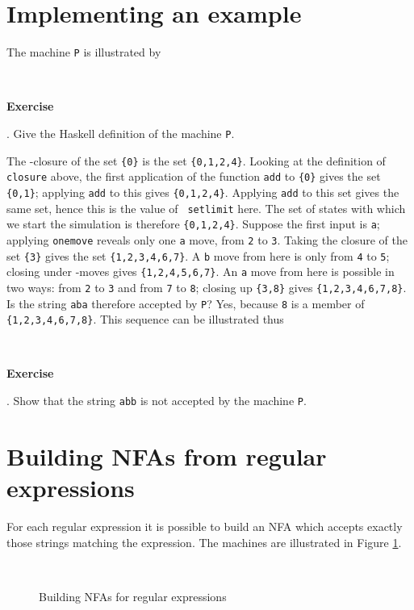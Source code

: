 \documentclass[11pt]{article}
\begin{document}
\section{Implementing an example}

The machine {\tt P} is illustrated by
\noindent
\begin{center}\  \end{center}

\medskip
\noindent
{\bf Exercise}

\medskip
{}. Give the Haskell definition of the machine {\tt P}.

\medskip
\noindent
The \eps-closure of the set {\tt \{0\}} is the set {\tt \{0,1,2,4\}}. 
Looking at the definition of {\tt closure} above, the
first application of the function {\tt add} to {\tt \{0\}} gives the set
{\tt \{0,1\}}; applying {\tt add} to this gives {\tt \{0,1,2,4\}}. Applying
{\tt add} to this set gives the same set, hence this is the value of {\tt
setlimit} here. The set of states with which we start the simulation
is therefore {\tt \{0,1,2,4\}}. Suppose the first input is {\tt a}; applying
{\tt onemove} reveals only one {\tt a} move, from {\tt 2} to {\tt 3}. Taking
the closure of the set {\tt \{3\}} gives the set {\tt \{1,2,3,4,6,7\}}. A
{\tt b} move from here is only from {\tt 4} to {\tt 5}; closing under
\eps-moves gives {\tt \{1,2,4,5,6,7\}}. An {\tt a} move from here is possible
in two ways: from {\tt 2} to {\tt 3} and from {\tt 7} to {\tt 8}; closing up
{\tt \{3,8\}} gives {\tt \{1,2,3,4,6,7,8\}}. Is the string {\tt aba} therefore
accepted by {\tt P}? Yes, because {\tt 8} is a member of {\tt
\{1,2,3,4,6,7,8\}}. This sequence can be illustrated thus
\noindent
\begin{center}\  \end{center}

\medskip
\noindent
{\bf Exercise}

\medskip
{}. Show that the string {\tt abb} is not accepted by the machine {\tt P}.

\section{Building NFAs from regular expressions}

For each regular expression it is possible to build an NFA which accepts
exactly those strings matching the expression. The machines are illustrated
in Figure \ref{buildNFA}.
%
\begin{figure}
\begin{center}\  \end{center}
\caption{Building NFAs for regular expressions}
\label{buildNFA}
\end{figure}
\end{document}
